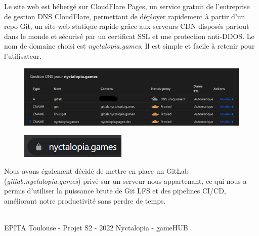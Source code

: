 Le site web est hébergé sur CloudFlare Pages, un service gratuit de l'entreprise de gestion DNS CloudFlare, permettant de déployer rapidement à partir d'un repo Git, un site web statique rapide grâce aux serveurs CDN disposés partout dans le monde et sécurisé par un certificat SSL et une protection anti-DDOS.
Le nom de domaine choisi est \emph{nyctalopia.games}. Il est simple et facile à retenir pour l'utilisateur.

\begin{figure}[H]
\centering
\begin{minipage}{.5\textwidth}
  \centering
  \centerline{\includegraphics[width=2\linewidth]{img/ui/dns.png}}
  \label{fig:dns}
\end{minipage}%
\end{figure}

\begin{figure}[H]
\centering
\begin{minipage}{.5\textwidth}
  \centering
  \centerline{\includegraphics[width=1.5\linewidth]{img/ssl.png}}
  \label{fig:ssl}
\end{minipage}%
\end{figure}

Nous avons également décidé de mettre en place un GitLab (\emph{gitlab.nyctalopia.games}) privé sur un serveur nous appartenant, ce qui nous a permis d'utiliser la puissance brute de Git LFS et des pipelines CI/CD, améliorant notre productivité sans perdre de temps.

\vfill
\noindent\makebox[\linewidth]{\rule{.8\paperwidth}{.6pt}}\\[0.2cm]
EPITA Toulouse - Projet S2 - 2022 \hfill Nyctalopia - gameHUB
\noindent\makebox[\linewidth]{\rule{.8\paperwidth}{.6pt}}

\newpage
